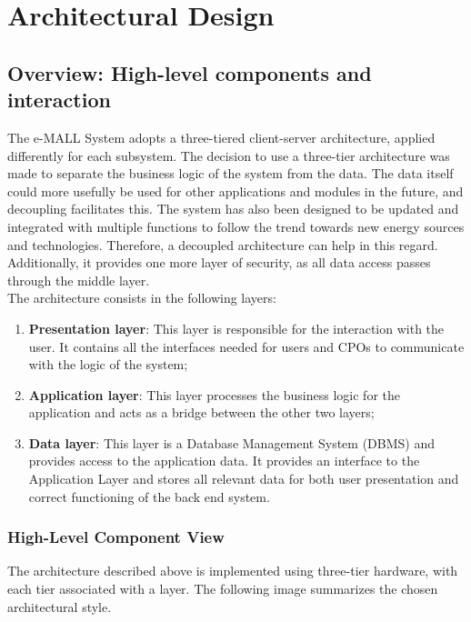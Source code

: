 \documentclass[12pt]{report}
\begin{document}
\chapter{Architectural Design}
\section{Overview: High-level components and interaction}
The e-MALL System adopts a three-tiered client-server architecture, applied differently for each subsystem.\newline
The decision to use a three-tier architecture was made to separate the business logic of the system from the data. The data itself could more usefully be used for other applications and modules in the future, and decoupling facilitates this.\newline
The system has also been designed to be updated and integrated with multiple functions to follow the trend towards new energy sources and technologies. Therefore, a decoupled architecture can help in this regard.\newline
Additionally, it provides one more layer of security, as all data access passes through the middle layer.\\
The architecture consists in the following layers:

\begin{enumerate}[L1:]
        \item\textbf{Presentation layer}: This layer is responsible for the interaction with the user. It contains all the interfaces needed for users and CPOs to communicate with the logic of the system;
        \item\textbf{Application layer}: This layer processes the business logic for the application and acts as a bridge between the other two layers;
        \item\textbf{Data layer}: This layer is a Database Management System (DBMS) and provides access to the application data. It provides an interface to the Application Layer and stores all relevant data for
        both user presentation and correct functioning of the back end system.
\end{enumerate}

\subsection{High-Level Component View}
\bigskip

The architecture described above is implemented using three-tier hardware, with each tier associated with a layer. The following image summarizes the chosen architectural style.
\bigskip 
\end{document}
